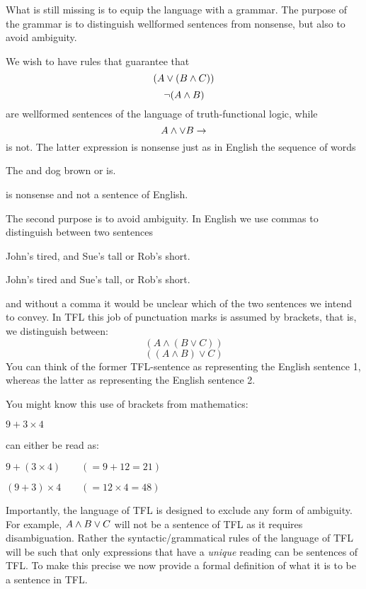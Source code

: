 What is still missing is to equip the language with a grammar. The purpose of the grammar is to distinguish wellformed sentences from nonsense, but also to avoid ambiguity.

We wish to have rules that guarantee that
$$(A\vee (B\mathbin{\wedge} C))$$ $$\neg (A\mathbin{\wedge} B)$$
are wellformed sentences of the language of truth-functional logic, while
$$A\mathbin{\wedge}\vee B\rightarrow$$
is not. The latter expression is nonsense just as in English the sequence of words
\begin{center}
The and dog brown or is.
\end{center}
is nonsense and not a sentence of English.



The second purpose is to avoid ambiguity. In English we use commas to distinguish between two sentences
\begin{earg}
\item[\ex{engamb1}] John's tired, and Sue's tall or Rob's short.
\item[\ex{engamb2}] John's tired and Sue's tall, or Rob's short.
\end{earg}
and without a comma it would be unclear which of the two sentences we intend to convey. In TFL this job of punctuation marks is assumed by brackets, that is, we distinguish between:
$$(A\wedge(B\vee C))$$
$$((A\wedge B)\vee C)$$
You can think of the former TFL-sentence as representing the English sentence 1, whereas the latter as representing the English sentence 2.

You might know this use of brackets from mathematics:
\begin{earg}
\item[\ex{mathamb}] $9 + 3 \times 4$
\end{earg}
can either be read as:
\begin{earg}
\item[\ex{mathamb1}] $9 + (3 \times 4) \qquad(=9+12=21)$
\item[\ex{mathamb2}] $(9+3) \times 4 \qquad(=12\times 4=48)$
\end{earg}

Importantly, the language of TFL is designed to exclude any form of ambiguity. For example, $A\mathbin{\wedge} B\vee C$ will not be a sentence of TFL as it requires disambiguation. Rather the syntactic/grammatical rules of the language of TFL will be such that only expressions that have a \emph{unique} reading can be sentences of TFL. To make this precise we now provide a formal definition of what it is to be a sentence in TFL.

